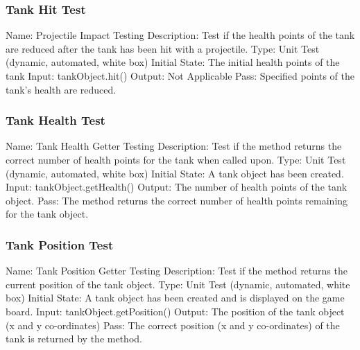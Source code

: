 \documentclass{article}
\begin{document}
\subsubsection{Tank Hit Test}
Name: Projectile Impact Testing\newline
Description: Test if the health points of the tank are reduced after the tank has been hit with a projectile.\newline
Type: Unit Test (dynamic, automated, white box)\newline
Initial State: The initial health points of the tank\newline
Input: tankObject.hit()\newline
Output: Not Applicable\newline
Pass: Specified points of the tank’s health are reduced.\newline

\subsubsection{Tank Health Test}
Name: Tank Health Getter Testing\newline
Description: Test if the method returns the correct number of health points for the tank when called upon.\newline
Type: Unit Test (dynamic, automated, white box)\newline
Initial State: A tank object has been created.\newline
Input: tankObject.getHealth()\newline
Output: The number of health points of the tank object.\newline
Pass: The method returns the correct number of health points remaining for the tank object.\newline

\subsubsection{Tank Position Test}
Name: Tank Position Getter Testing\newline
Description: Test if the method returns the current position of the tank object.\newline
Type: Unit Test (dynamic, automated, white box)\newline
Initial State: A tank object has been created and is displayed on the game board.\newline
Input: tankObject.getPosition()\newline
Output: The position of the tank object (x and y co-ordinates)\newline
Pass: The correct position (x and y co-ordinates) of the tank is returned by the method.\newline
\end{document}

